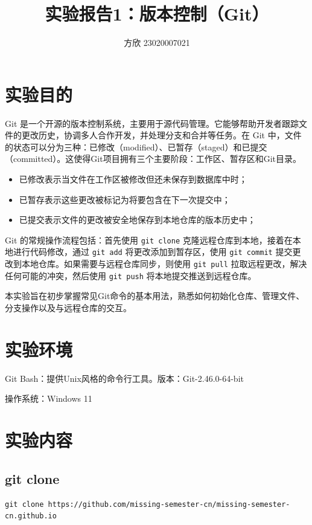 \documentclass{article}
\title{实验报告1：版本控制（Git）}
\author{方欣 23020007021}
\date{}
\begin{document}
\maketitle

\tableofcontents
\thispagestyle{empty}			

\newpage
\section{实验目的}
Git 是一个开源的版本控制系统，主要用于源代码管理。它能够帮助开发者跟踪文件的更改历史，协调多人合作开发，并处理分支和合并等任务。在 Git 中，文件的状态可以分为三种：已修改（modified）、已暂存（staged）和已提交（committed）。这使得Git项目拥有三个主要阶段：工作区、暂存区和Git目录。
\begin{itemize}
    \item 已修改表示当文件在工作区被修改但还未保存到数据库中时；
    \item 已暂存表示这些更改被标记为将要包含在下一次提交中；
    \item 已提交表示文件的更改被安全地保存到本地仓库的版本历史中；
\end{itemize}
Git 的常规操作流程包括：首先使用 \texttt{git clone} 克隆远程仓库到本地，接着在本地进行代码修改，通过 \texttt{git add} 将更改添加到暂存区，使用 \texttt{git commit} 提交更改到本地仓库。如果需要与远程仓库同步，则使用 \texttt{git pull} 拉取远程更改，解决任何可能的冲突，然后使用 \texttt{git push} 将本地提交推送到远程仓库。

本实验旨在初步掌握常见Git命令的基本用法，熟悉如何初始化仓库、管理文件、分支操作以及与远程仓库的交互。

\section{实验环境}
Git Bash：提供Unix风格的命令行工具。版本：Git-2.46.0-64-bit

操作系统：Windows 11

\section{实验内容}

\subsection{git clone}

\lstset{language=bash}
\begin{lstlisting}
git clone https://github.com/missing-semester-cn/missing-semester-cn.github.io
\end{lstlisting}
\end{document}
